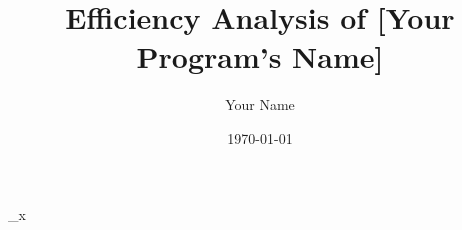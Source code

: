 \documentclass[a4paper,12pt]{report}
\begin{document}
\title{Efficiency Analysis of [Your Program's Name]}
\author{Your Name}
\date{\today}
\maketitle
\lim_{x \to \infty}  
\end{document}
